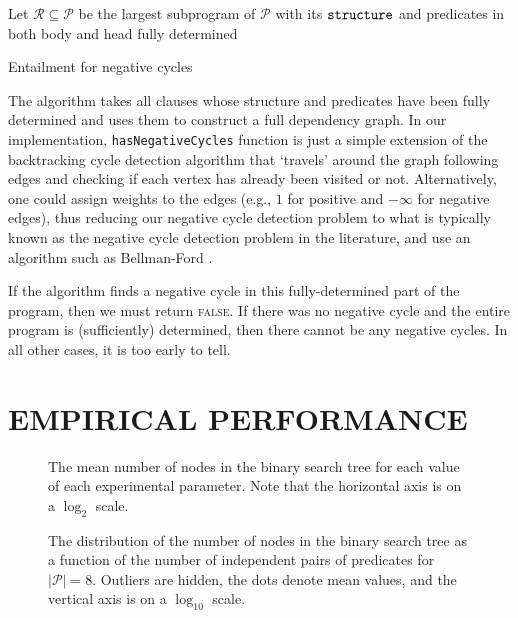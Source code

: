 \documentclass[letterpaper]{article}
\theoremstyle{definition}
\newcommand{\variable}[1]{\texttt{\textup{#1}}}
\newcommand{\predicates}{\mathcal{P}}
\begin{document}
\begin{algorithm}
  Let $\mathscr{R} \subseteq \mathscr{P}$ be the largest subprogram of
  $\mathscr{P}$ with its $\variable{structure}$ and predicates in both body
  and head fully determined\footnotemark\;
  \;
  \caption{Entailment for negative cycles}
  \label{alg:negative_cycles}
\end{algorithm}

The algorithm takes all clauses whose structure and predicates have been fully
determined and uses them to construct a full dependency graph. In our
implementation, \texttt{hasNegativeCycles} function is just a simple extension
of the backtracking cycle detection algorithm that `travels' around the graph
following edges and checking if each vertex has already been visited or not.
Alternatively, one could assign weights to the edges (e.g., $1$ for positive
and $-\infty$ for negative edges), thus reducing our negative cycle detection
problem to what is typically known as the negative cycle detection problem in
the literature, and use an algorithm such as Bellman-Ford
\citep{shimbel1954structure}.

If the algorithm finds a negative cycle in this fully-determined part of the
program, then we must return \textsc{false}. If there was no negative cycle and
the entire program is (sufficiently) determined, then there cannot be any
negative cycles. In all other cases, it is too early to tell.

\section{EMPIRICAL PERFORMANCE} \label{sec:experiments}

\begin{figure}
  \centering
  
  \caption{The mean number of nodes in the binary search tree for each value of
    each experimental parameter. Note that the horizontal axis is on a $\log_2$
    scale.}
  \label{fig:impact}
\end{figure}

\begin{figure*}
  \centering
  
  \caption{The distribution of the number of nodes in the binary search tree as
    a function of the number of independent pairs of predicates for
    $|\predicates| = 8$. Outliers are hidden, the dots denote mean values, and
    the vertical axis is on a $\log_{10}$ scale.}
  \label{fig:phase_transition}
\end{figure*}
\end{document}

